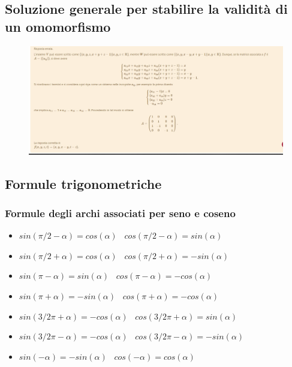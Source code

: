 \documentclass[12pt]{article}
\newenvironment{para}{\begin{adjustwidth}{13mm}{}}{\end{adjustwidth}}
\begin{document}
\begin{para}
\subsection{Soluzione generale per stabilire la validità di un omomorfismo}
\begin{figure}[h]
    \hspace*{-3cm}%
    \includegraphics[width = 1.45\linewidth]{Immagini/Soluzione.jpeg}
    \hspace*{-3cm}%
    \vspace*{-1,4cm}%
\end{figure}
\subsection{Formule trigonometriche}
\subsubsection{Formule degli archi associati per seno e coseno}
\begin{itemize}
    \item $sin(\pi/2-\alpha) = cos(\alpha) \; \; \; cos(\pi/2 - \alpha) = sin(\alpha)$
    \item $sin(\pi/2 + \alpha) = cos(\alpha) \; \; \; cos(\pi/2 + \alpha) = -sin(\alpha)$
    \item $sin(\pi - \alpha) = sin(\alpha) \; \; \; cos(\pi - \alpha) = -cos(\alpha)$
    \item $sin(\pi + \alpha) = -sin(\alpha) \; \; \; cos (\pi + \alpha) = -cos(\alpha)$
    \item $sin(3/2\pi + \alpha) = -cos(\alpha) \; \; \; cos(3/2\pi + \alpha) = sin(\alpha)$
    \item $sin(3/2 \pi - \alpha) = -cos(\alpha) \; \; \; cos(3/2 \pi - \alpha) = -sin(\alpha)$
    \item $sin(-\alpha) = -sin(\alpha) \; \; \; cos(-\alpha) = cos(\alpha)$
\end{itemize}

\end{para}
\end{document}
